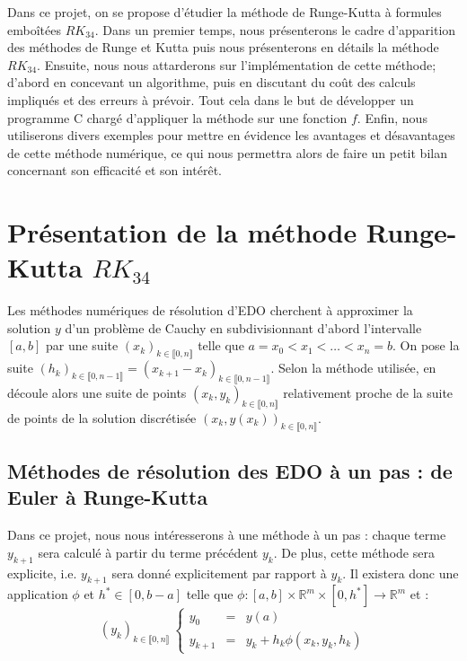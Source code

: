 \documentclass[a4paper, titlepage]{livret} %
\begin{document}
		Dans ce projet, on se propose d'étudier la méthode de Runge-Kutta à formules emboîtées $RK_{34}$. 
		Dans un premier temps, nous présenterons le cadre d'apparition des méthodes de Runge et Kutta puis nous présenterons en détails la méthode $RK_{34}$.
		Ensuite, nous nous attarderons sur l'implémentation de cette méthode; d'abord en concevant un algorithme, puis en discutant du coût des calculs impliqués et des erreurs à prévoir. 
		Tout cela dans le but de développer un programme C chargé d'appliquer la méthode sur une fonction $f$.
		Enfin, nous utiliserons divers exemples pour mettre en évidence les avantages et désavantages de cette méthode numérique, ce qui nous permettra alors de faire un petit bilan concernant son efficacité et son intérêt.


	\setcounter{tocdepth}{2} %
	\tableofcontents %
	
	\chapter{Présentation de la méthode Runge-Kutta $RK_{34}$}
		Les méthodes numériques de résolution d'EDO cherchent à approximer la solution $y$ d'un problème de Cauchy en subdivisionnant d'abord l'intervalle $[a,b]$ par une suite $(x_{k})_{k \in \llbracket 0, n \rrbracket}$ telle que $a = x_{0} < x_{1} < … < x_{n} = b$.
		On pose la suite $(h_{k})_{k \in \llbracket 0, n-1 \rrbracket} = (x_{k+1} - x_{k})_{k \in \llbracket 0, n-1 \rrbracket}$.
		Selon la méthode utilisée, en découle alors une suite de points $(x_{k}, y_{k})_{k \in \llbracket 0, n \rrbracket}$ relativement proche de la suite de points de la solution discrétisée $(x_{k}, y(x_{k}))_{k \in \llbracket 0, n \rrbracket}$.

		\section{Méthodes de résolution des EDO à un pas : de Euler à Runge-Kutta}
			Dans ce projet, nous nous intéresserons à une méthode à un pas : chaque terme $y_{k+1}$ sera calculé à partir du terme précédent $y_{k}$.
			De plus, cette méthode sera explicite, i.e. $y_{k+1}$ sera donné explicitement par rapport à $y_{k}$.
			Il existera donc une application $\phi$ et $h^{*} \in [0, b-a]$ telle que $\phi : [a,b] \times \mathbb{R}^{m} \times [0, h^{*}] \to \mathbb{R}^{m}$ et :
			\[(y_{k})_{k \in \llbracket 0, n \rrbracket} \
			\left\{
				\begin{array}{rcl}
					y_{0} & = & y(a) \\
					y_{k+1} & = & y_{k} + h_{k}\phi(x_{k}, y_{k}, h_{k})	
				\end{array}
			\right.
			\]
\end{document}
